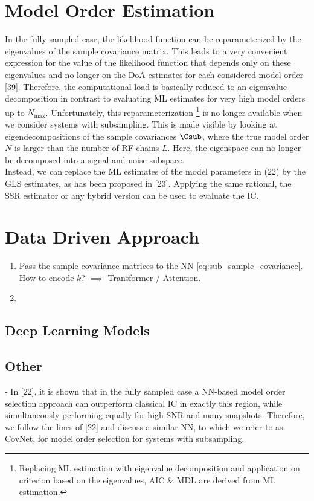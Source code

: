 \section{Model Order Estimation}
In the fully sampled case, the likelihood function can be reparameterized by the eigenvalues of the sample covariance
matrix. This leads to a very convenient expression for the value of the likelihood function that depends only on these
eigenvalues and no longer on the DoA estimates for each considered model order [39]. Therefore, the computational load
is basically reduced to an eigenvalue decomposition in contrast to evaluating ML estimates for very high model orders up
to \( N_{\max} \). Unfortunately, this reparameterization%
\footnote{Replacing ML estimation with eigenvalue decomposition and application on criterion based on the eigenvalues, AIC \& MDL are derived from ML estimation.}
is no longer available when we consider systems with subsampling.
This is made visible by looking at eigendecompositions of the sample covariances \( \Csub \), where the true model order \( N \) is larger
than the number of RF chains \( L \). Here, the eigenspace can no longer be decomposed into a signal and noise subspace.\\

Instead, we can replace the ML estimates of the model parameters in (22) by the GLS estimates, as has been proposed in [23].
Applying the same rational, the SSR estimator or any hybrid version can be used to evaluate the IC.

\section{Data Driven Approach}
\begin{enumerate}
 \item Pass the sample covariance matrices to the NN \autoref{eq:sub_sample_covariance}. How to encode \( k \)? \( \implies \) Transformer / Attention.

 \item
\end{enumerate}


\subsection{Deep Learning Models}


\subsection{Other}
- In [22], it is shown that in the fully sampled case a NN-based model order selection approach can outperform classical
IC in exactly this region, while simultaneously performing equally for high SNR and many snapshots. Therefore, we follow
the lines of [22] and discuss a similar NN, to which we refer to as CovNet, for model order selection for systems with subsampling.

